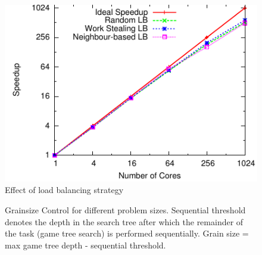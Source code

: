 \documentclass[10pt, conference, compsocconf]{IEEEtran}
\begin{document}
\begin{figure}[ht]
\centering
\includegraphics[width=0.9\columnwidth]{plots/3schemes.pdf}

\caption{Effect of load balancing strategy}
\label{3schemes}
\vspace{-0.2in}
\end{figure}
 

\label{grainsize}

\begin{figure}[ht]
\centering
{} 
\caption{Grainsize Control for different problem sizes. Sequential threshold denotes the depth in the search tree after which the remainder of the task (game tree search) is performed sequentially. Grain size = max game tree depth - sequential threshold.}
\label{fig:dep}
\vspace{-0.2in}
\end{figure}
%
\end{document}
